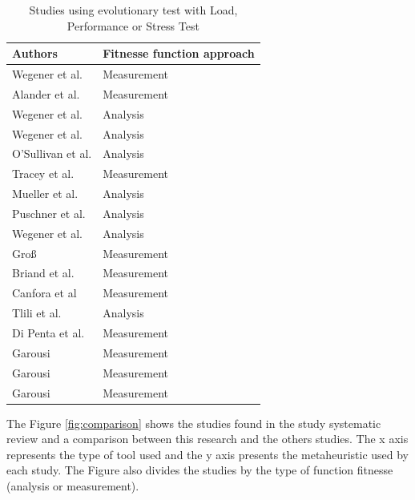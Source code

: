 \begin{table}[h]
\centering
\caption{Studies using evolutionary test with Load, Performance or Stress Test}
\label{tab:fitapproach}
\begin{tabular}{|l|l|}
\hline
Authors & Fitnesse function approach\\
\hline
Wegener et al. \cite{J.WegenerK.GrimmM.GrochtmannH.Sthamer1996}& Measurement \\
\hline
Alander et al. \cite{alander1998searching}& Measurement \\
\hline
Wegener et al. \cite{wegener1997testing} & Analysis \\
\hline
Wegener et al. \cite{wegener1998verifying}& Analysis\\
\hline
O'Sullivan et al.\cite{Sullivan}& Analysis\\
\hline
Tracey et al.\cite{Tracey1998}&  Measurement\\
\hline
Mueller et al.\cite{Mueller1998}& Analysis\\
\hline
Puschner et al.\cite{Puschner1998}&Analysis\\
\hline
Wegener et al.\cite{Stations}&Analysis\\
\hline
Gro\ss\hspace{1pt} \cite{Gro}\cite{Gross2003}&  Measurement\\
\hline
Briand et al. \cite{Briand2005}&  Measurement\\
\hline
Canfora et al \cite{Canfora}&  Measurement\\
\hline
Tlili et al. \cite{Tlili1917}&Analysis\\
\hline
Di Penta et al. \cite{Penta2007}&  Measurement\\
\hline
Garousi \cite{Garousi2006}&  Measurement\\
\hline
Garousi \cite{Garousi2008}&  Measurement\\
\hline
Garousi \cite{Garousi2010}&  Measurement\\

\hline
\end{tabular}
\end{table}

%
%
The Figure \ref{fig:comparison}  shows the studies found in the study systematic review and a comparison between this research and the others studies. The x axis represents the type of tool used  and the y axis presents the metaheuristic used by each study. The Figure also divides the studies by the type of function fitnesse (analysis or measurement).

